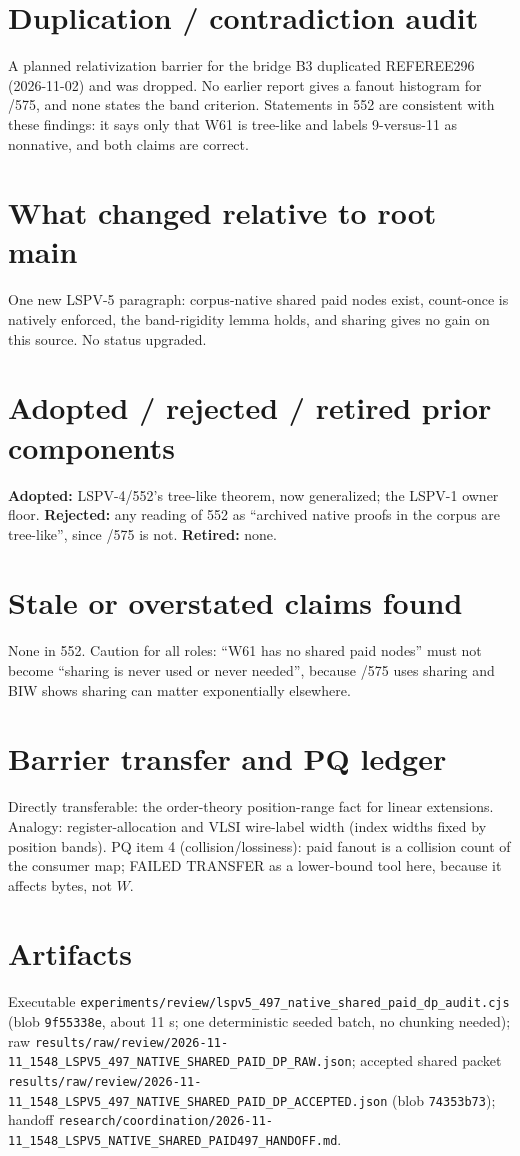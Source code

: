 \documentclass[11pt]{article}
\begin{document}
\section*{Duplication / contradiction audit}
A planned relativization barrier for the bridge B3 duplicated REFEREE296 (2026-11-02) and was dropped. No earlier
report gives a fanout histogram for /575, and none states the band criterion. Statements in 552 are
consistent with these findings: it says only that W61 is tree-like and labels 9-versus-11 as nonnative, and both claims are correct.

\section*{What changed relative to root main}
One new LSPV-5 paragraph: corpus-native shared paid nodes exist, count-once is natively enforced, the band-rigidity
lemma holds, and sharing gives no gain on this source. No status upgraded.

\section*{Adopted / rejected / retired prior components}
\textbf{Adopted:} LSPV-4/552's tree-like theorem, now generalized; the LSPV-1 owner floor. \textbf{Rejected:} any reading of
552 as ``archived native proofs in the corpus are tree-like'', since /575 is not. \textbf{Retired:} none.

\section*{Stale or overstated claims found}
None in 552. Caution for all roles: ``W61 has no shared paid nodes'' must not become ``sharing is never used or never
needed'', because /575 uses sharing and BIW shows sharing can matter exponentially elsewhere.

\section*{Barrier transfer and PQ ledger}
Directly transferable: the order-theory position-range fact for linear extensions. Analogy: register-allocation and
VLSI wire-label width (index widths fixed by position bands). PQ item 4 (collision/lossiness): paid fanout is a collision
count of the consumer map; FAILED TRANSFER as a lower-bound tool here, because it affects bytes, not $W$.

\section*{Artifacts}
Executable \texttt{experiments/review/lspv5\_497\_native\_shared\_paid\_dp\_audit.cjs} (blob \texttt{9f55338e}, about 11 s; one
deterministic seeded batch, no chunking needed); raw
\texttt{results/raw/review/2026-11-11\_1548\_LSPV5\_497\_NATIVE\_SHARED\_PAID\_DP\_RAW.json}; accepted shared packet
\texttt{results/raw/review/2026-11-11\_1548\_LSPV5\_497\_NATIVE\_SHARED\_PAID\_DP\_ACCEPTED.json} (blob \texttt{74353b73}); handoff
\texttt{research/coordination/2026-11-11\_1548\_LSPV5\_NATIVE\_SHARED\_PAID497\_HANDOFF.md}.
\end{document}
